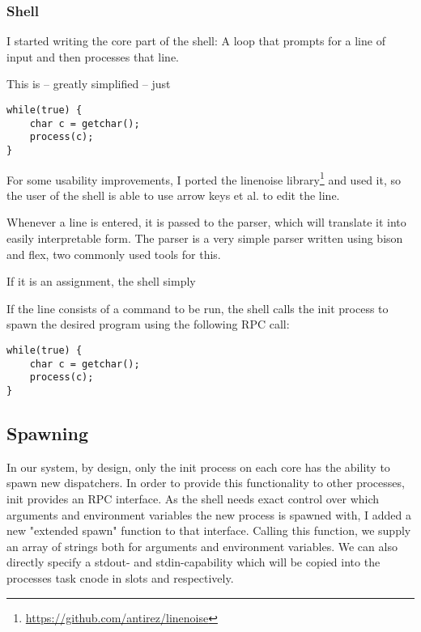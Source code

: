 \subsubsection{Shell}
I started writing the core part of the shell: A loop that prompts for a line of input and then processes that line.

This is -- greatly simplified -- just
\begin{mdframed}[style=myframe]
\begin{verbatim}
while(true) {
    char c = getchar();
    process(c);
}
\end{verbatim}
\end{mdframed}

For some usability improvements, I ported
the linenoise library\footnote{\url{https://github.com/antirez/linenoise}}
and used it, so the user of the shell is able to use arrow keys et al. to edit the line.

Whenever a line is entered, it is passed to the parser, which will translate it into easily interpretable form.
The parser is a very simple parser written using bison and flex, two commonly used tools for this.


If it is an assignment, the shell simply 

If the line consists of a command to be run, the shell calls the init process to spawn the desired program using the following RPC call:

\begin{mdframed}[style=myframe]
\begin{verbatim}
while(true) {
    char c = getchar();
    process(c);
}
\end{verbatim}
\end{mdframed}



\subsection{Spawning}
In our system, by design, only the init process on each core has the ability to spawn new dispatchers.
In order to provide this functionality to other processes, init provides an RPC interface.
As the shell needs exact control over which arguments and environment variables the new process is
spawned with, I added a new "extended spawn" function to that interface. Calling this function,
we supply an array of strings both for arguments and environment variables. We can also directly specify
a stdout- and stdin-capability which will be copied into the processes task cnode in slots
 and  respectively.

